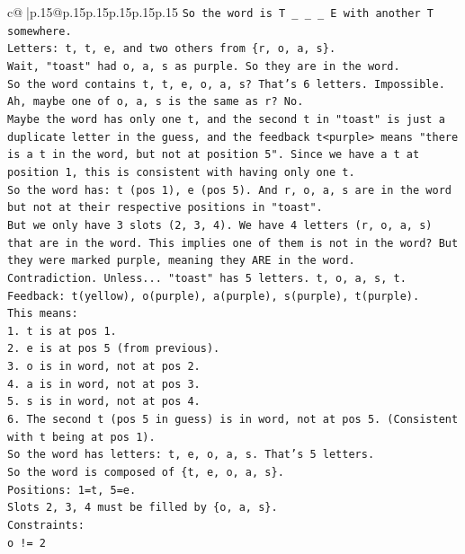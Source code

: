 \documentclass{article}
\begin{document}
{\begin{supertabular}{c@{$\;$}|p{.15\linewidth}@{}p{.15\linewidth}p{.15\linewidth}p{.15\linewidth}p{.15\linewidth}p{.15\linewidth}}
{{{\texttt{So the word is T \_ \_ \_ E with another T somewhere.} \\
\texttt{Letters: t, t, e, and two others from \{r, o, a, s\}.} \\
\texttt{Wait, "toast" had o, a, s as purple. So they are in the word.} \\
\texttt{So the word contains t, t, e, o, a, s? That's 6 letters. Impossible.} \\
\texttt{Ah, maybe one of o, a, s is the same as r? No.} \\
\texttt{Maybe the word has only one t, and the second t in "toast" is just a duplicate letter in the guess, and the feedback t<purple> means "there is a t in the word, but not at position 5". Since we have a t at position 1, this is consistent with having only one t.} \\
\texttt{So the word has: t (pos 1), e (pos 5). And r, o, a, s are in the word but not at their respective positions in "toast".} \\
\texttt{But we only have 3 slots (2, 3, 4). We have 4 letters (r, o, a, s) that are in the word. This implies one of them is not in the word? But they were marked purple, meaning they ARE in the word.} \\
\texttt{Contradiction. Unless... "toast" has 5 letters. t, o, a, s, t.} \\
\texttt{Feedback: t(yellow), o(purple), a(purple), s(purple), t(purple).} \\
\texttt{This means:} \\
\texttt{1. t is at pos 1.} \\
\texttt{2. e is at pos 5 (from previous).} \\
\texttt{3. o is in word, not at pos 2.} \\
\texttt{4. a is in word, not at pos 3.} \\
\texttt{5. s is in word, not at pos 4.} \\
\texttt{6. The second t (pos 5 in guess) is in word, not at pos 5. (Consistent with t being at pos 1).} \\
\texttt{So the word has letters: t, e, o, a, s. That's 5 letters.} \\
\texttt{So the word is composed of \{t, e, o, a, s\}.} \\
\texttt{Positions: 1=t, 5=e.} \\
\texttt{Slots 2, 3, 4 must be filled by \{o, a, s\}.} \\
\texttt{Constraints:} \\
\texttt{o != 2} \\
}}}
\end{supertabular}}
\end{document}
